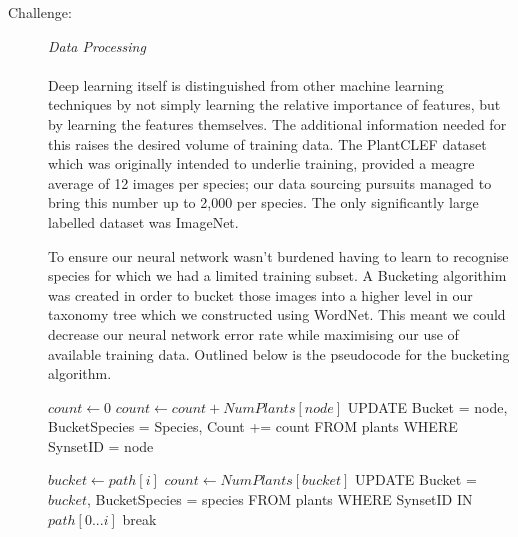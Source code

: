 \documentclass[a4paper,11pt]{article}
\begin{document}
\begin{description}

\item [Challenge:] \textit{Data Processing}\\\\
Deep learning itself is distinguished from other machine learning techniques by not simply learning the relative importance of features, but by learning the features themselves. The additional information needed for this raises the desired volume of training data. The PlantCLEF dataset which was originally intended to underlie training, provided a meagre average of 12 images per species; our data sourcing pursuits managed to bring this number up to 2,000 per species. The only significantly large labelled dataset was ImageNet. 

\hspace{5 mm} To ensure our neural network wasn’t burdened having to learn to recognise species for which we had a limited training subset. A Bucketing algorithim was created in order to bucket those images into a higher level in our taxonomy tree which we constructed using WordNet\cite{wordnet}. This meant we could decrease our neural network error rate while maximising our use of available training data. Outlined below is the pseudocode for the bucketing algorithm.\\

\clearpage


\begin{algorithmic}[1]
	\State $count \gets 0$
		\State $count \gets count+NumPlants[node]$
		\State UPDATE Bucket = node, BucketSpecies = Species, Count += count 
		\State		FROM plants 
		\State		WHERE SynsetID = node
	\EndFor
\EndProcedure 
\Statex
\end{algorithmic}

\begin{algorithmic}[1]
		\State $bucket \gets path[i]$
		\State $count \gets NumPlants[bucket]$
			\State UPDATE Bucket = $bucket$, BucketSpecies = species 
			\State		FROM plants 
			\State		WHERE SynsetID IN $path[0 ... i]$
			\State break
		\EndIf
	\EndFor
\EndProcedure 
\Statex
\end{algorithmic} 

\end{description}
\end{document}
